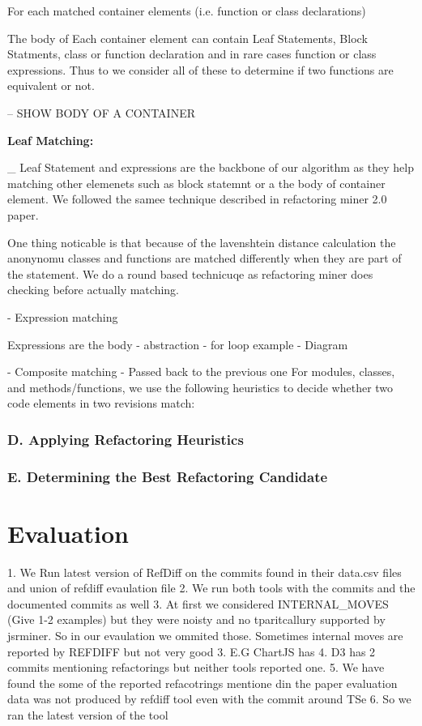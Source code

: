 \documentclass[letterpaper,12pt,onecolumn,final]{report}
\begin{document}
For each matched container elements (i.e. function or class declarations)

The body of Each container element can contain Leaf Statements, Block Statments, class or function declaration and in rare cases function or class expressions. Thus to we consider all of these to determine if two functions are equivalent or not.

-- SHOW BODY OF A CONTAINER

\textbf{Leaf Matching:}

_ Leaf Statement and expressions are the backbone of our algorithm as they help matching other elemenets such as block statemnt or a the body of container element. We followed the samee technique described in refactoring miner 2.0 paper.

One thing noticable is that because of the lavenshtein distance calculation the anonynomu classes and functions are matched differently when they are part of the statement. We do a round based technicuqe as refactoring miner does checking before actually matching.


- Expression matching

Expressions are the body 
- abstraction
- for loop example
- Diagram

- Composite matching
- Passed back to the previous one
For modules, classes, and
methods/functions, we use the following heuristics to decide
whether two code elements in two revisions match:

\subsection *{D. Applying Refactoring Heuristics}
\subsection *{E. Determining the Best Refactoring Candidate}

\chapter{Evaluation}

1. We Run latest version of RefDiff on the commits found in their data.csv files and union of refdiff evaulation file
2. We run both tools with the commits and the documented commits as well
3. At first we considered INTERNAL_MOVES (Give 1-2 examples) but they were noisty and no tparitcallury supported by jsrminer. So in our evaulation we ommited those. Sometimes internal moves are reported by REFDIFF but not very good
3. E.G ChartJS has 
4. D3 has 2 commits mentioning refactorings but neither tools reported one.
5. We have found the some of the reported refacotrings mentione din the paper evaluation data was not produced by refdiff tool even with the commit around TSe
6. So we ran the latest version of the tool
\end{document}
